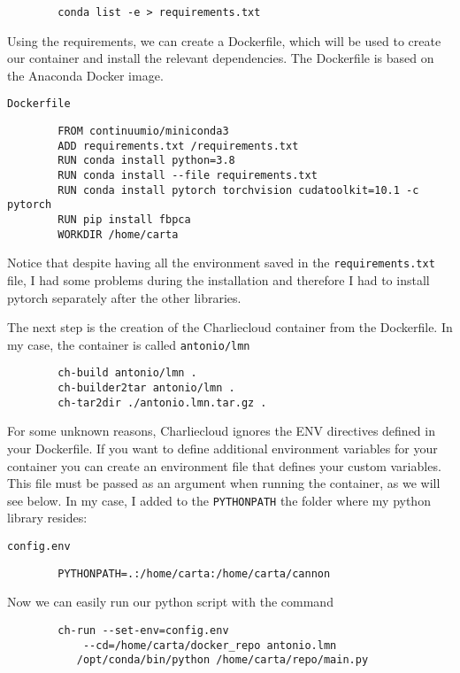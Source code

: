\documentclass{article}
\begin{document}
    \begin{verbatim}
        conda list -e > requirements.txt
    \end{verbatim}

    Using the requirements, we can create a Dockerfile, which will be used to create our container and install the relevant dependencies. The Dockerfile is based on the Anaconda Docker image.

    \verb!Dockerfile!
    \begin{verbatim}
        FROM continuumio/miniconda3
        ADD requirements.txt /requirements.txt
        RUN conda install python=3.8
        RUN conda install --file requirements.txt
        RUN conda install pytorch torchvision cudatoolkit=10.1 -c pytorch
        RUN pip install fbpca
        WORKDIR /home/carta
    \end{verbatim}

    Notice that despite having all the environment saved in the \verb!requirements.txt! file, I had some problems during the installation and therefore I had to install pytorch separately after the other libraries.

    The next step is the creation of the Charliecloud container from the Dockerfile. In my case, the container is called \verb!antonio/lmn!
    \begin{verbatim}
        ch-build antonio/lmn .
        ch-builder2tar antonio/lmn .
        ch-tar2dir ./antonio.lmn.tar.gz .        
    \end{verbatim}

    For some unknown reasons, Charliecloud ignores the ENV directives defined in your Dockerfile. If you want to define additional environment variables for your container you can create an environment file that defines your custom variables. This file must be passed as an argument when running the container, as we will see below. In my case, I added to the \lstinline{PYTHONPATH} the folder where my python library resides:

    \verb!config.env!
    \begin{verbatim}
        PYTHONPATH=.:/home/carta:/home/carta/cannon
    \end{verbatim}

    Now we can easily run our python script with the command
    \begin{verbatim}
        ch-run --set-env=config.env 
            --cd=/home/carta/docker_repo antonio.lmn 
           /opt/conda/bin/python /home/carta/repo/main.py
    \end{verbatim}
\end{document}
